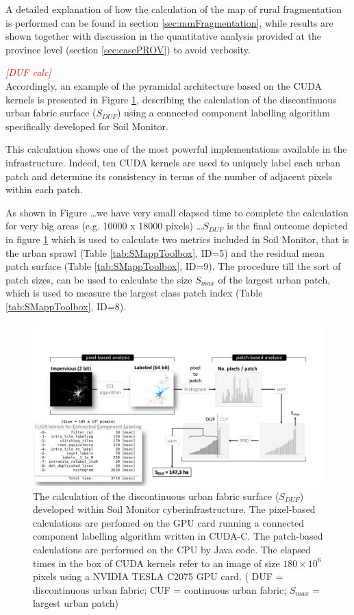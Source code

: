 \documentclass[APA,LATO1COL,doublespace]{WileyNJD-v2}
\newcommand{\toberevised}[1]{\emph{\textcolor{red}{#1}}} %
\begin{document}
A detailed explanation of how the calculation of the map of rural fragmentation is performed can be found in section \ref{sec:mmFragmentation}, while results are shown
 together with discussion
in the quantitative analysis provided at the province level (section \ref{sec:casePROV}) to avoid verbosity.

\toberevised{[DUF calc]}\\
Accordingly, an example of the pyramidal architecture based on the CUDA kernels is presented in Figure \ref{fig:ccl}, describing the calculation of the discontinuous urban fabric surface ($S_{DUF}$) using a connected component labelling algorithm specifically developed for Soil Monitor.

This calculation shows one of the most powerful implementations available in the infrastructure.
Indeed, ten CUDA kernels are used to uniquely label each urban patch and determine its consistency in terms of the number of adjacent pixels within each patch.

As shown in Figure \ldots we have very small elapsed time to complete the calculation for very big areas (e.g. 10000 x 18000 pixels)
\ldots $S_{DUF}$  is the final outcome depicted in figure \ref{fig:ccl} which is used to calculate two metrics included in Soil Monitor, that is the urban sprawl (Table \ref{tab:SMappToolbox}, ID=5) and the residual mean patch surface (Table \ref{tab:SMappToolbox}, ID=9).
The procedure till the sort of patch sizes, can be used to calculate the size $S_{max}$ of the largest urban patch, which is used to measure the largest class patch index (Table \ref{tab:SMappToolbox}, ID=8).

\begin{figure}[t] %
    \centerline{\includegraphics[width=500pt]{daMileti/03_DUF_explanation.pdf}}
    \caption{ The calculation of the discontinuous urban fabric surface ($S_{DUF}$) developed within Soil Monitor cyberinfrastructure. 
    The pixel-based calculations are perfomed on the GPU card running a connected component labelling algorithm written in CUDA-C. 
    The patch-based calculations are performed on the CPU by Java code.
    The elapsed times in the box of CUDA kernels refer to an image of size $180 \times 10^6$ pixels using a NVIDIA TESLA C2075 GPU card.
    ( DUF = discontinuous urban fabric; CUF = continuous urban fabric; $S_{max}$ = largest urban patch)} \label{fig:ccl}
\end{figure}
\end{document}
